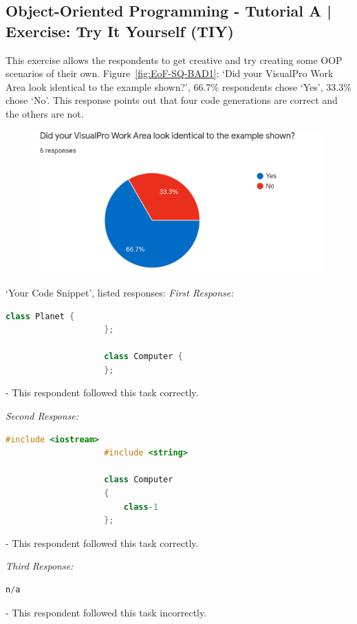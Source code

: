 \documentclass[12pt]{report} %
\begin{document}
			\subsection{Object-Oriented Programming - Tutorial A | Exercise: Try It Yourself (TIY)}
				This exercise allows the respondents to get creative and try creating some OOP scenarios of their own. Figure~\ref{fig:EoF-SQ-BAD1}: `Did your VisualPro Work Area look identical to the example shown?', 66.7\% respondents chose `Yes', 33.3\% chose `No'. This response points out that four code generations are correct and the others are not.
				
				\begin{figure}[H]
					{\includegraphics[scale=0.50]{Figures/VisualPro-Survey_Results/SQ-BAD1.png}}
				\end{figure}

				`Your Code Snippet', listed responses:
				\textit{First Response:}
				\begin{lstlisting}[language=c++]
					class Planet {
					};

					class Computer {
					};
				\end{lstlisting} - This respondent followed this task correctly.

				\textit{Second Response:}
				\begin{lstlisting}[language=c++]
					#include <iostream>
					#include <string>

					class Computer
					{
						class-1
					};
				\end{lstlisting} - This respondent followed this task correctly.

				\textit{Third Response:}
				\begin{lstlisting}[language=c++]
					n/a
				\end{lstlisting} - This respondent followed this task incorrectly.
\end{document}

